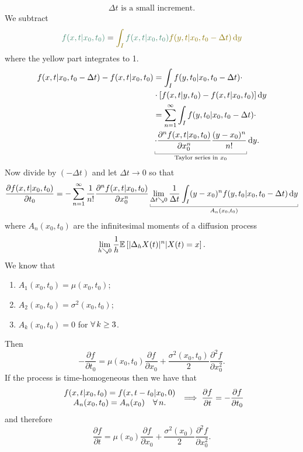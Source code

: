 \documentclass[12pt]{report}
\begin{document}
\begin{fancyproof}
\begin{equation*}
\begin{array}{l}
			\Delta t\text{ is a small increment}.
		\end{array}
	\end{equation*}
	We subtract
	\begin{equation*}
		\mathcolor{Aquamarine4}{f(x,t|x_{0},t_{0})}=\mathcolor{Gold4}{\int_{I}}\mathcolor{Aquamarine4}{f(x,t|x_{0},t_{0})}\mathcolor{Gold4}{f(y,t|x_{0},t_{0}-\Delta t)\dy}
	\end{equation*}
	where the \textcolor{Gold4}{yellow} part integrates to 1. 
	\begin{align*}
		f(x,t|x_{0},t_{0}-\Delta t)-f(x,t|x_{0},t_{0})&=\int_{I}f(y,t_{0}|x_{0},t_{0}-\Delta t)\cdot\\
		&\cdot[f(x,t|y,t_{0})-f(x,t|x_{0},t_{0})]\dy\\
		&=\sum_{n=1}^{\infty}\int_{I}f(y,t_{0}|x_{0},t_{0}-\Delta t)\cdot\\
		&\ubracketthin{\cdot\frac{\partial^{n}f(x,t|x_{0},t_{0})}{\partial x_{0}^{n}}\frac{(y-x_{0})^{n}}{n!}}_{\claptext{Taylor series in $x_{0}$}}\dy.
	\end{align*}
	Now divide by $(-\Delta t)$ and let $\Delta t\to0$ so that
	\begin{equation*}
		\frac{\partial f(x,t|x_{0},t_{0})}{\partial t_{0}}=-\sum^{\infty}_{n=1}\frac{1}{n!}\frac{\partial^{n}f(x,t|x_{0},t_{0})}{\partial x^{n}_{0}}\ubracketthin{\lim_{\Delta t\searrow0}\frac{1}{\Delta t}\int_{I}(y-x_{0})^{n}f(y,t_{0}|x_{0},t_{0}-\Delta t)\dy}_{A_{n}(x_{0},t_{0})}
	\end{equation*}
	where $A_{n}(x_{0},t_{0})$ are the infinitesimal moments of a diffusion process
	\begin{equation*}
		\lim_{h\searrow0}\frac{1}{h}\mathbb{E}\left[|\Delta_{h}X(t)|^{n}|X(t)=x\right].
	\end{equation*}
	We know that
	\begin{enumerate}
		\item $A_{1}(x_{0},t_{0})=\mu(x_{0},t_{0})$;
		\item $A_{2}(x_{0},t_{0})=\sigma^{2}(x_{0},t_{0})$;
		\item $A_{k}(x_{0},t_{0})=0$ for $\forall\, k\geq3$.
	\end{enumerate}
	Then
	\begin{equation*}
		-\frac{\partial f}{\partial t_{0}}=\mu(x_{0},t_{0})\frac{\partial f}{\partial x_{0}}+\frac{\sigma^{2}(x_{0},t_{0})}{2}\frac{\partial^{2}f}{\partial x_{0}^{2}}.
	\end{equation*}
	If the process is time-homogeneous then we have that
	\begin{equation*}
		\begin{array}{c}
			f(x,t|x_{0},t_{0})=f(x,t-t_{0}|x_{0},0)\\
			A_{n}(x_{0},t_{0})=A_{n}(x_{0})\quad\forall\, n.
		\end{array}\implies\frac{\partial f}{\partial t}=-\frac{\partial f}{\partial t_{0}}
	\end{equation*}
	and therefore
	\begin{equation*}
		\frac{\partial f}{\partial t}=\mu(x_{0})\frac{\partial f}{\partial x_{0}}+\frac{\sigma^{2}(x_{0})}{2}\frac{\partial^{2}f}{\partial x_{0}^{2}}.
	\end{equation*}
\end{fancyproof}
\end{document}
